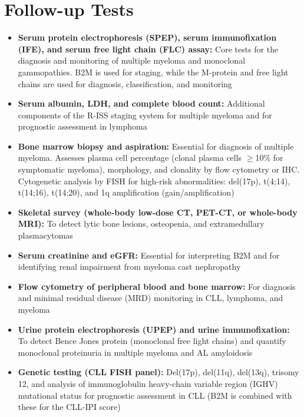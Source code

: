 \section*{Follow-up Tests}
\begin{itemize}
  \item \textbf{Serum protein electrophoresis (SPEP), serum immunofixation (IFE), and serum free light chain (FLC) assay:} Core tests for the diagnosis and monitoring of multiple myeloma and monoclonal gammopathies. B2M is used for staging, while the M-protein and free light chains are used for diagnosis, classification, and monitoring
  \item \textbf{Serum albumin, LDH, and complete blood count:} Additional components of the R-ISS staging system for multiple myeloma and for prognostic assessment in lymphoma
  \item \textbf{Bone marrow biopsy and aspiration:} Essential for diagnosis of multiple myeloma. Assesses plasma cell percentage (clonal plasma cells $\geq$10\% for symptomatic myeloma), morphology, and clonality by flow cytometry or IHC. Cytogenetic analysis by FISH for high-risk abnormalities: del(17p), t(4;14), t(14;16), t(14;20), and 1q amplification (gain/amplification)
  \item \textbf{Skeletal survey (whole-body low-dose CT, PET-CT, or whole-body MRI):} To detect lytic bone lesions, osteopenia, and extramedullary plasmacytomas
  \item \textbf{Serum creatinine and eGFR:} Essential for interpreting B2M and for identifying renal impairment from myeloma cast nephropathy
  \item \textbf{Flow cytometry of peripheral blood and bone marrow:} For diagnosis and minimal residual disease (MRD) monitoring in CLL, lymphoma, and myeloma
  \item \textbf{Urine protein electrophoresis (UPEP) and urine immunofixation:} To detect Bence Jones protein (monoclonal free light chains) and quantify monoclonal proteinuria in multiple myeloma and AL amyloidosis
  \item \textbf{Genetic testing (CLL FISH panel):} Del(17p), del(11q), del(13q), trisomy 12, and analysis of immunoglobulin heavy-chain variable region (IGHV) mutational status for prognostic assessment in CLL (B2M is combined with these for the CLL-IPI score)
\end{itemize}

